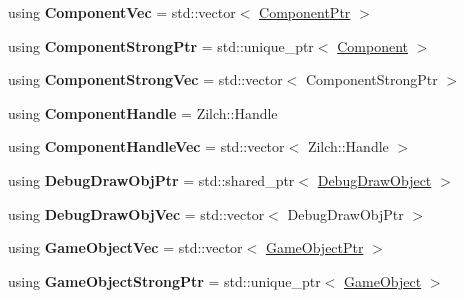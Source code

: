 \begin{DoxyCompactItemize}
\item 
\hypertarget{namespaceDCEngine_a2e7f474eec165d1a7552f0b4473ee4cd}{using {\bfseries Component\-Vec} = std\-::vector$<$ \hyperlink{classDCEngine_1_1Component}{Component\-Ptr} $>$}\label{namespaceDCEngine_a2e7f474eec165d1a7552f0b4473ee4cd}

\item 
\hypertarget{namespaceDCEngine_a2fc7506f691f5c7a2d7f0fcce904100f}{using {\bfseries Component\-Strong\-Ptr} = std\-::unique\-\_\-ptr$<$ \hyperlink{classDCEngine_1_1Component}{Component} $>$}\label{namespaceDCEngine_a2fc7506f691f5c7a2d7f0fcce904100f}

\item 
\hypertarget{namespaceDCEngine_ad54b610d8788964be979d4f22fa88838}{using {\bfseries Component\-Strong\-Vec} = std\-::vector$<$ Component\-Strong\-Ptr $>$}\label{namespaceDCEngine_ad54b610d8788964be979d4f22fa88838}

\item 
\hypertarget{namespaceDCEngine_a4923810d797e7861321f57140768fbe9}{using {\bfseries Component\-Handle} = Zilch\-::\-Handle}\label{namespaceDCEngine_a4923810d797e7861321f57140768fbe9}

\item 
\hypertarget{namespaceDCEngine_a7275cd7945932366bf1286eb4017c181}{using {\bfseries Component\-Handle\-Vec} = std\-::vector$<$ Zilch\-::\-Handle $>$}\label{namespaceDCEngine_a7275cd7945932366bf1286eb4017c181}

\item 
\hypertarget{namespaceDCEngine_ad57f4d995dae12293b185ab6f5fda420}{using {\bfseries Debug\-Draw\-Obj\-Ptr} = std\-::shared\-\_\-ptr$<$ \hyperlink{classDCEngine_1_1DebugDrawObject}{Debug\-Draw\-Object} $>$}\label{namespaceDCEngine_ad57f4d995dae12293b185ab6f5fda420}

\item 
\hypertarget{namespaceDCEngine_af0b53770d00cac4bbe402ee2195bf46d}{using {\bfseries Debug\-Draw\-Obj\-Vec} = std\-::vector$<$ Debug\-Draw\-Obj\-Ptr $>$}\label{namespaceDCEngine_af0b53770d00cac4bbe402ee2195bf46d}

\item 
\hypertarget{namespaceDCEngine_a7ace5d7fd290adf80b89e0cb41717fe5}{using {\bfseries Game\-Object\-Vec} = std\-::vector$<$ \hyperlink{classDCEngine_1_1GameObject}{Game\-Object\-Ptr} $>$}\label{namespaceDCEngine_a7ace5d7fd290adf80b89e0cb41717fe5}

\item 
\hypertarget{namespaceDCEngine_a7623f31d10dc869c486230fd48cd3b4c}{using {\bfseries Game\-Object\-Strong\-Ptr} = std\-::unique\-\_\-ptr$<$ \hyperlink{classDCEngine_1_1GameObject}{Game\-Object} $>$}\label{namespaceDCEngine_a7623f31d10dc869c486230fd48cd3b4c}


\end{DoxyCompactItemize}
